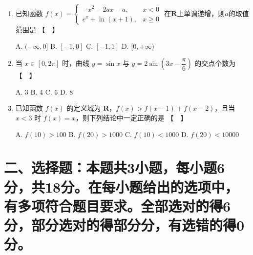 \documentclass[12pt,a4paper]{article}
\begin{document}
\begin{enumerate}[label=\arabic*.]
\vspace{0.3cm}

\item 已知函数 $f(x)=\begin{cases} -x^2-2ax-a, & x<0 \\ e^x+\ln(x+1), & x\geqslant 0 \end{cases}$ 在$\mathbf{R}$上单调递增，则$a$的取值范围是 \hfill 【　】

A. $(-\infty,0]$ \quad B. $[-1,0]$ \quad C. $[-1,1]$ \quad D. $[0,+\infty)$

\vspace{0.3cm}

\item 当 $x\in[0,2\pi]$ 时，曲线 $y=\sin x$ 与 $y=2\sin\left(3x-\dfrac{\pi}{6}\right)$ 的交点个数为 \hfill 【　】

A. 3 \quad B. 4 \quad C. 6 \quad D. 8

\vspace{0.3cm}

\item 已知函数 $f(x)$ 的定义域为 $\mathbf{R}$，$f(x)>f(x-1)+f(x-2)$，且当 $x<3$ 时 $f(x)=x$，则下列结论中一定正确的是 \hfill 【　】

A. $f(10)>100$ \quad B. $f(20)>1000$ \quad C. $f(10)<1000$ \quad D. $f(20)<10000$

\end{enumerate}

\section*{二、选择题：本题共3小题，每小题6分，共18分。在每小题给出的选项中，有多项符合题目要求。全部选对的得6分，部分选对的得部分分，有选错的得0分。}
\end{document}
